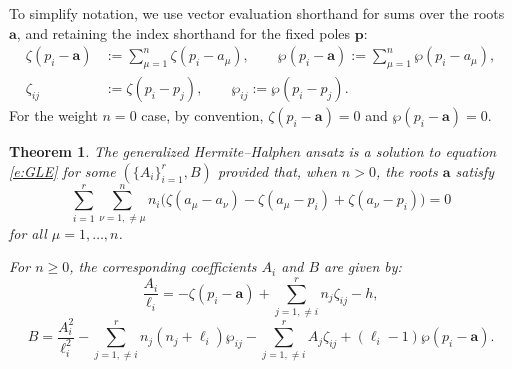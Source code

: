 \documentclass[11pt]{amsart}
\newtheorem{theorem}{Theorem}[section]
\theoremstyle{remark}
\numberwithin{equation}{section}
\begin{document}
To simplify notation, we use vector evaluation shorthand for sums over the roots $\mathbf{a}$, and retaining the index shorthand for the fixed poles $\mathbf{p}$:
\begin{equation}
\begin{split}
\zeta(p_i - \mathbf{a}) &:= \sum_{\mu = 1}^n \zeta(p_i - a_\mu), \qquad \wp(p_i - \mathbf{a}) := \sum_{\mu = 1}^n \wp(p_i - a_\mu), \\
\zeta_{ij} &:= \zeta(p_i - p_j), \qquad \wp_{ij} := \wp(p_i - p_j).
\end{split}
\end{equation}
For the weight $n=0$ case, by convention, $\zeta(p_i - \mathbf{a}) = 0$ and $\wp(p_i - \mathbf{a}) = 0$.

\begin{theorem} \label{Ansatz}
The generalized Hermite--Halphen ansatz is a solution to equation \eqref{e:GLE} for some $(\{A_i\}_{i = 1}^r, B)$ provided that, when $n>0$, the roots $\mathbf{a}$ satisfy
\begin{equation} \label{Gene-Lame-Curve}
\sum_{i = 1}^{r} \sum_{\nu = 1, \neq \mu}^n 
n_i\Big(
\zeta(a_\mu - a_\nu) - \zeta(a_\mu - p_{i}) +  \zeta(a_\nu - p_{i})
\Big) = 0
\end{equation}
for all $\mu = 1, \ldots, n$. 

For $n \geq 0$, the corresponding coefficients $A_i$ and $B$ are given by:
\begin{equation} \label{A-a}
\frac{A_i}{\ell_i} = - \zeta(p_i - \mathbf{a}) + \sum_{j = 1, \ne i}^r n_j \zeta_{ij} - h,
\end{equation}
\begin{equation} \label{B-a}
B = \frac{A_i^2}{\ell_i^2} - \sum_{j = 1, \ne i}^r n_j(n_j + \ell_i) \wp_{ij} - \sum_{j = 1, \neq i}^{r} A_j \zeta_{ij} + (\ell_i - 1) \wp(p_i - \mathbf{a}).
\end{equation}
\end{theorem}
\end{document}
